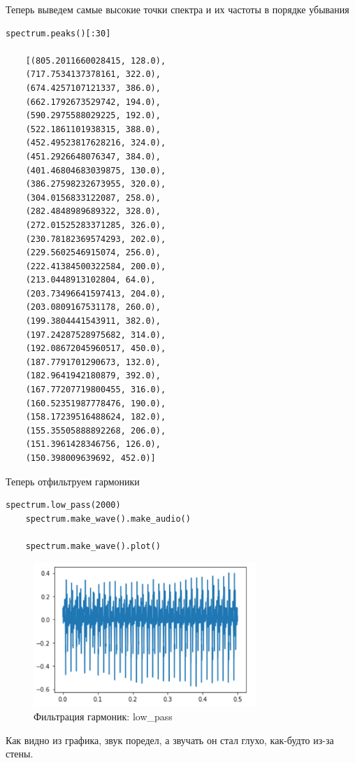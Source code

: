 \documentclass[a4paper,12pt]{article}
\begin{document}
Теперь выведем самые высокие точки спектра и их частоты в порядке 
убывания
\begin{lstlisting}[caption=Пики спектра]
	spectrum.peaks()[:30]
	
	[(805.2011660028415, 128.0),
	(717.7534137378161, 322.0),
	(674.4257107121337, 386.0),
	(662.1792673529742, 194.0),
	(590.2975588029225, 192.0),
	(522.1861101938315, 388.0),
	(452.49523817628216, 324.0),
	(451.2926648076347, 384.0),
	(401.46804683039875, 130.0),
	(386.27598232673955, 320.0),
	(304.0156833122087, 258.0),
	(282.4848989689322, 328.0),
	(272.01525283371285, 326.0),
	(230.78182369574293, 202.0),
	(229.5602546915074, 256.0),
	(222.41384500322584, 200.0),
	(213.0448913102804, 64.0),
	(203.73496641597413, 204.0),
	(203.0809167531178, 260.0),
	(199.3804441543911, 382.0),
	(197.24287528975682, 314.0),
	(192.08672045960517, 450.0),
	(187.7791701290673, 132.0),
	(182.9641942180879, 392.0),
	(167.77207719800455, 316.0),
	(160.52351987778476, 190.0),
	(158.17239516488624, 182.0),
	(155.35505888892268, 206.0),
	(151.3961428346756, 126.0),
	(150.398009639692, 452.0)]
\end{lstlisting}


Теперь отфильтруем гармоники
\begin{lstlisting}[caption=Фильтрация гармоник: low\_pass]
	spectrum.low_pass(2000)
	spectrum.make_wave().make_audio()
	
	spectrum.make_wave().plot()
\end{lstlisting}
\begin{figure}[H]
	\centering
	\includegraphics[width=0.75\textwidth]{2_6.png}
	\caption{Фильтрация гармоник: low\_pass}
	\label{fig:2.6}
\end{figure}

Как видно из графика, звук поредел, а звучать он стал глухо, как-будто из-за стены.
\end{document}
